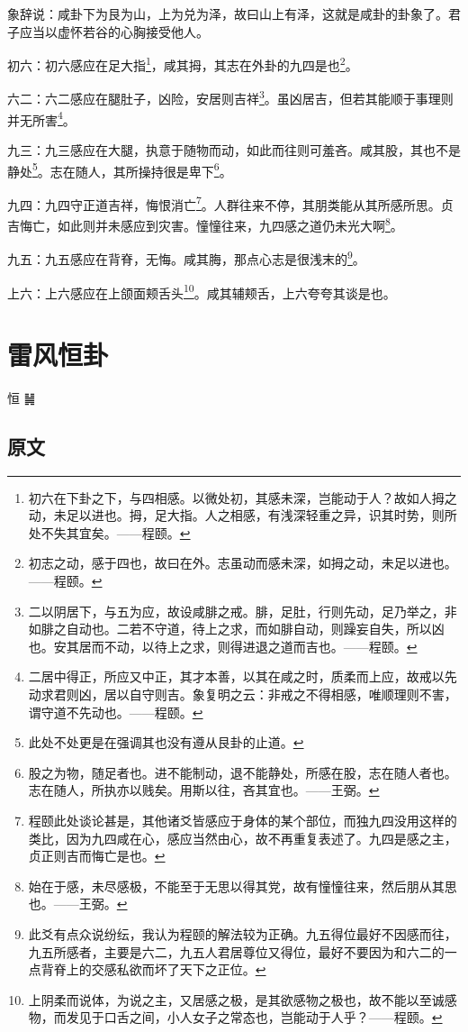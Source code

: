 \documentclass[12pt,oneside]{book}
\begin{document}
象辞说：咸卦下为艮为山，上为兑为泽，故曰山上有泽，这就是咸卦的卦象了。君子应当以虚怀若谷的心胸接受他人。

初六：初六感应在足大指\footnote{初六在下卦之下，与四相感。以微处初，其感未深，岂能动于人？故如人拇之动，未足以进也。拇，足大指。人之相感，有浅深轻重之异，识其时势，则所处不失其宜矣。——程颐。}，咸其拇，其志在外卦的九四是也\footnote{初志之动，感于四也，故曰在外。志虽动而感未深，如拇之动，未足以进也。——程颐。}。

六二：六二感应在腿肚子，凶险，安居则吉祥\footnote{二以阴居下，与五为应，故设咸腓之戒。腓，足肚，行则先动，足乃举之，非如腓之自动也。二若不守道，待上之求，而如腓自动，则躁妄自失，所以凶也。安其居而不动，以待上之求，则得进退之道而吉也。——程颐。}。虽凶居吉，但若其能顺于事理则并无所害\footnote{二居中得正，所应又中正，其才本善，以其在咸之时，质柔而上应，故戒以先动求君则凶，居以自守则吉。象复明之云：非戒之不得相感，唯顺理则不害，谓守道不先动也。——程颐。}。

九三：九三感应在大腿，执意于随物而动，如此而往则可羞吝。咸其股，其也不是静处\footnote{此处不处更是在强调其也没有遵从艮卦的止道。}。志在随人，其所操持很是卑下\footnote{股之为物，随足者也。进不能制动，退不能静处，所感在股，志在随人者也。志在随人，所执亦以贱矣。用斯以往，吝其宜也。——王弼。}。

九四：九四守正道吉祥，悔恨消亡\footnote{程颐此处谈论甚是，其他诸爻皆感应于身体的某个部位，而独九四没用这样的类比，因为九四咸在心，感应当然由心，故不再重复表述了。九四是感之主，贞正则吉而悔亡是也。}。人群往来不停，其朋类能从其所感所思。贞吉悔亡，如此则并未感应到灾害。憧憧往来，九四感之道仍未光大啊\footnote{始在于感，未尽感极，不能至于无思以得其党，故有憧憧往来，然后朋从其思也。——王弼。}。

九五：九五感应在背脊，无悔。咸其脢，那点心志是很浅末的\footnote{此爻有点众说纷纭，我认为程颐的解法较为正确。九五得位最好不因感而往，九五所感者，主要是六二，九五人君居尊位又得位，最好不要因为和六二的一点背脊上的交感私欲而坏了天下之正位。}。

上六：上六感应在上颌面颊舌头\footnote{上阴柔而说体，为说之主，又居感之极，是其欲感物之极也，故不能以至诚感物，而发见于口舌之间，小人女子之常态也，岂能动于人乎？——程颐。}。咸其辅颊舌，上六夸夸其谈是也。

\chapter{雷风恒卦}
恒 {\Large ䷟}

\section{原文}
\end{document}
